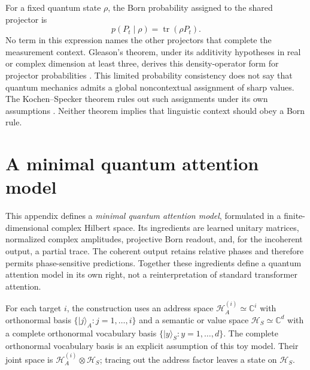 \documentclass[
  aps,
  reprint,
  superscriptaddress,
  floatfix,
  nofootinbib,
  longbibliography
]{revtex4-2}
\begin{document}
For a fixed quantum state $\rho$, the Born probability assigned to the shared
projector is
\begin{equation}
 p(P_t\mid\rho)=\operatorname{tr}(\rho P_t).
 \label{eq:born-shared-app}
\end{equation}
No term in this expression names the other projectors that complete the
measurement context.  Gleason's theorem, under its additivity hypotheses in
real or complex dimension at least three, derives this density-operator form
for projector probabilities \cite{Gleason}.  This limited probability
consistency does not say that quantum mechanics admits a global
noncontextual assignment of sharp values.  The Kochen--Specker theorem rules
out such assignments under its own assumptions \cite{specker-60,kochen1}.
Neither theorem implies that linguistic context should obey a Born rule.


\section{A minimal quantum attention model}
\label{app:quantum-attention}

This appendix defines a \emph{minimal quantum attention model}, formulated in
a finite-dimensional complex Hilbert space.  Its ingredients are
learned unitary matrices, normalized complex amplitudes, projective Born
readout, and, for the incoherent output, a partial trace.  The coherent output
retains relative phases and therefore permits phase-sensitive predictions.
Together these ingredients define a quantum attention model in its own right,
not a reinterpretation of standard transformer attention.

For each target $i$, the construction uses an address space
$\mathcal H_A^{(i)}\simeq\mathbb C^i$ with orthonormal basis
$\{|j\rangle_A:j=1,\ldots,i\}$ and a semantic or value space
$\mathcal H_S\simeq\mathbb C^d$ with a complete orthonormal vocabulary basis
$\{|y\rangle_S:y=1,\ldots,d\}$.  The complete orthonormal vocabulary basis is
an explicit assumption of this toy model.  Their joint space is
$\mathcal H_A^{(i)}\otimes\mathcal H_S$; tracing out the address factor leaves
a state on $\mathcal H_S$.
\end{document}
